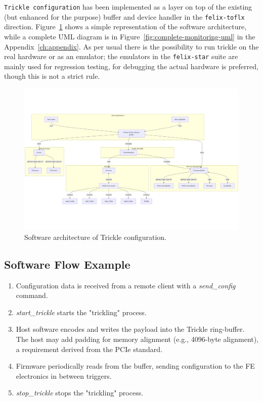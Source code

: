 \texttt{Trickle configuration} \cite{felix-star-trickle-configuration} has been implemented as a layer on top of the existing (but enhanced for the purpose) buffer and device handler in the \texttt{felix-toflx} direction. Figure~\ref{fig:trickle-software-architecture} shows a simple representation of the software architecture, while a complete UML diagram is in Figure~\ref{fig:complete-monitoring-uml} in the Appendix~\ref{ch:appendix}. As per usual there is the possibility to run trickle on the real hardware or as an emulator; the emulators in the \texttt{felix-star} suite are mainly used for regression testing, for debugging the actual hardware is preferred, though this is not a strict rule.

\begin{figure}[htbp]
\centering
\includegraphics[width=\textwidth]{images/contributions/trickle-architecture.png}
\caption{Software architecture of Trickle configuration.}
\label{fig:trickle-software-architecture}
\end{figure}

\subsection{Software Flow Example}
\begin{enumerate}
    \item Configuration data is received from a remote client with a \textit{send\_config} command.
    \item \textit{start\_trickle} starts the "trickling" process.
    \item Host software encodes and writes the payload into the Trickle ring-buffer. The host may add padding for memory alignment (e.g., 4096-byte alignment), a requirement derived from the \acs{PCIe} standard.
    \item Firmware periodically reads from the buffer, sending configuration to the \acs{FE} electronics in between triggers.
    \item \textit{stop\_trickle} stops the "trickling" process.
\end{enumerate}

